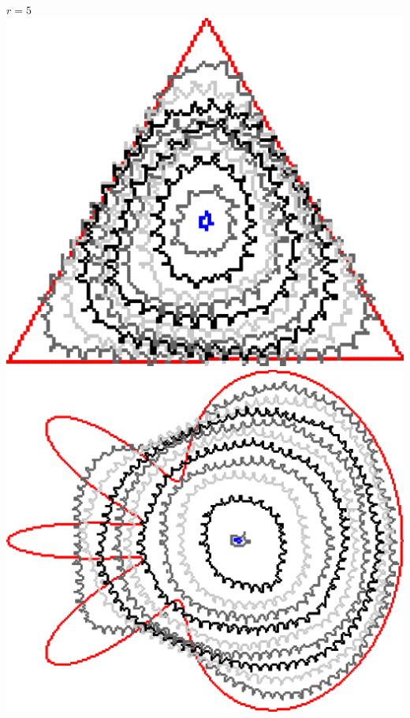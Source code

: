 \begin{frame}
\begin{minipage}{0.49\textwidth}
\end{minipage}
\begin{minipage}{0.49\textwidth}
\center
$r=5$\\
\includegraphics[scale=0.2]{figures/non-submodular-elastica/radius-effect/triangle-r5.png}\\[1em]
\includegraphics[scale=0.2]{figures/non-submodular-elastica/radius-effect/flower-r5.png}
\end{minipage}

\end{frame}

